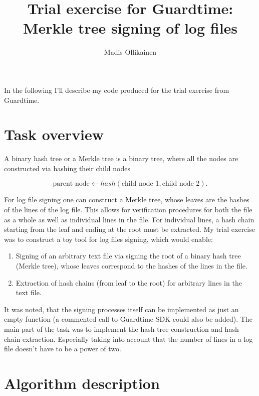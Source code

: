 \documentclass[11pt]{article}
\author{Madis Ollikainen}
\title{Trial exercise for Guardtime: Merkle tree signing of log files}
\begin{document}
\maketitle

In the following I'll describe my code produced for the trial exercise from Guardtime. 

\section{Task overview} %
\label{sec:task_overview}


A binary hash tree or a Merkle tree is a binary tree, where all the nodes are constructed via hashing their child nodes

\begin{equation}
 \text{parent node} \leftarrow hash( \text{child node 1}, \text{child node 2} ). 	
\end{equation} 

For log file signing one can construct a Merkle tree, whose leaves are the hashes of the lines of the log file. This allows for verification procedures for both the file as a whole as well as individual lines in the file. For individual lines, a hash chain starting from the leaf and ending at the root must be extracted. My trial exercise was to construct a toy tool for log files signing, which would enable:  

\begin{enumerate}
  	\item Signing of an arbitrary text file via signing the root of a binary hash tree (Merkle tree), whose leaves correspond to the hashes of the lines in the file.
  	\item Extraction of hash chains (from leaf to the root) for arbitrary lines in the text file.  
\end{enumerate}  

It was noted, that the signing processes itself can be implemented as just an empty function (a commented call to Guardtime SDK could also be added). The main part of the task was to implement the hash tree construction and hash chain extraction. Especially taking into account that the number of lines in a log file doesn't have to be a power of two. 


\section{Algorithm description} %
\label{sec:algorithm_description}
\end{document}
